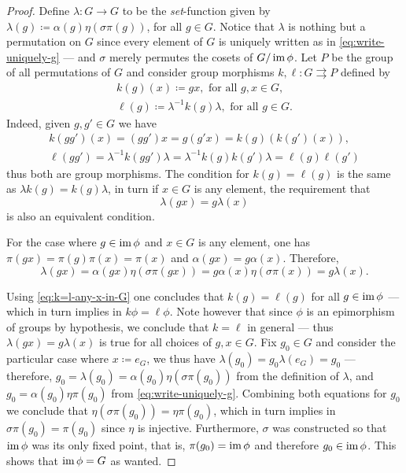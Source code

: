 \begin{proof}
Define \(\lambda: G \to G\) to be the \emph{set}-function given by
\(\lambda(g) \coloneq \alpha(g) \eta (\sigma \pi(g))\), for all \(g \in
G\). Notice that \(\lambda\) is nothing but a permutation on \(G\) since every
element of \(G\) is uniquely written as in \cref{eq:write-uniquely-g} --- and
\(\sigma\) merely permutes the cosets of \(G/\operatorname{im} \phi\). Let \(P\) be the group
of all permutations of \(G\) and consider group morphisms
\(k, \ell: G \rightrightarrows P\) defined by
\begin{gather}
  \label{gath:k-definition-gx}
  k(g)(x)  \coloneq  g x, \text{ for all } g, x \in G, \\
  \label{gath:ell-definition-g}
  \ell(g) \coloneq \lambda^{-1} k(g) \lambda, \text{ for all } g \in G.
\end{gather}
Indeed, given \(g, g' \in G\) we have
\begin{gather*}
k(g g')(x) = (g g') x = g (g' x) = k(g)(k(g')(x)), \\
\ell(g g') = \lambda^{-1} k(g g') \lambda
= \lambda^{-1} k(g) k(g') \lambda = \ell(g) \ell(g')
\end{gather*}
thus both are group morphisms. The condition for \(k(g) = \ell(g)\) is the same
as \(\lambda k(g) = k(g) \lambda\), in turn if \(x \in G\) is any element,
the requirement that
\begin{equation}\label{eq:k=l-any-x-in-G}
  \lambda(g x) = g \lambda(x)
\end{equation}
is also an equivalent condition.

For the case where \(g \in \operatorname{im} \phi\) and \(x \in G\) is any element, one has
\(\pi(g x) = \pi(g) \pi(x) = \pi(x)\) and \(\alpha(g x) = g
\alpha(x)\). Therefore,
\[
\lambda(g x)
= \alpha(g x) \eta(\sigma \pi(g x))
= g \alpha(x) \eta(\sigma \pi(x))
= g \lambda(x).
\]


Using \cref{eq:k=l-any-x-in-G} one concludes that \(k(g) = \ell(g)\) for all
\(g \in \operatorname{im} \phi\) --- which in turn implies in \(k \phi = \ell \phi\). Note
however that since \(\phi\) is an epimorphism of groups by hypothesis, we
conclude that \(k = \ell\) in general --- thus \(\lambda(g x) = g \lambda(x)\)
is true for all choices of \(g, x \in G\). Fix \(g_0 \in G\) and consider the
particular case where \(x \coloneq e_G\), we thus have
\(\lambda(g_0) = g_0 \lambda(e_G) = g_0\) --- therefore,
\(g_0 = \lambda(g_0) = \alpha(g_0) \eta (\sigma \pi(g_0))\) from the definition
of \(\lambda\), and \(g_0 = \alpha(g_0) \eta \pi(g_0)\) from
\cref{eq:write-uniquely-g}. Combining both equations for \(g_0\) we conclude
that \(\eta (\sigma \pi(g_0)) = \eta \pi(g_0)\), which in turn implies in
\(\sigma \pi(g_0) = \pi(g_0)\) since \(\eta\) is injective. Furthermore,
\(\sigma\) was constructed so that \(\operatorname{im} \phi\) was its only fixed point, that
is, \(\pi(g_0) = \operatorname{im} \phi\) and therefore \(g_0 \in \operatorname{im} \phi\). This shows that
\(\operatorname{im} \phi = G\) as wanted.
\end{proof}

